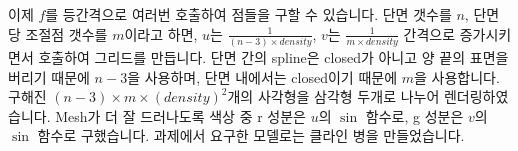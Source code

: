 \documentclass[11pt]{article}
\begin{document}
이제 $f$를 등간격으로 여러번 호출하여 점들을 구할 수 있습니다.
단면 갯수를 $n$, 단면 당 조절점 갯수를 $m$이라고 하면, $u$는 $\frac{1}{(n-3) \times density}$, $v$는 $\frac{1}{m \times density}$ 간격으로 증가시키면서 호출하여 그리드를 만듭니다.
단면 간의 spline은 closed가 아니고 양 끝의 표면을 버리기 때문에 $n-3$을 사용하며, 단면 내에서는 closed이기 때문에 $m$을 사용합니다.
구해진 $(n-3) \times m \times (density)^2$개의 사각형을 삼각형 두개로 나누어 렌더링하였습니다.
Mesh가 더 잘 드러나도록 색상 중 r 성분은 $u$의 $\sin$ 함수로, g 성분은 $v$의 $\sin$ 함수로 구했습니다.
과제에서 요구한 모델로는 클라인 병을 만들었습니다.
\end{document}
